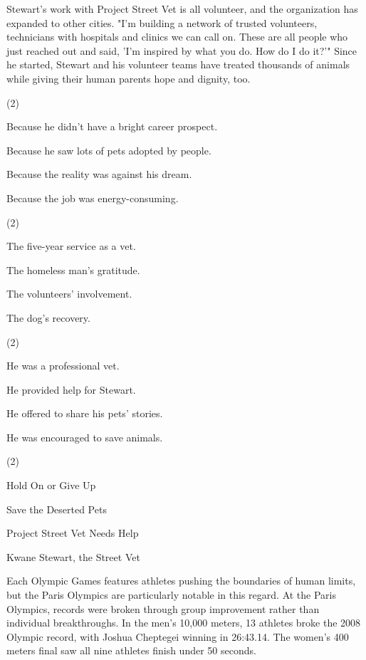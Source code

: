 \documentclass{英语试卷}
\begin{document}
\par Stewart's work with Project Street Vet is all volunteer, and the organization has expanded to other cities. "I'm building a network of trusted volunteers, technicians with hospitals and clinics we can call on. These are all people who just reached out and said, 'I'm inspired by what you do. How do I do it?'" Since he started, Stewart and his volunteer teams have treated thousands of animals while giving their human parents hope and dignity, too.\par
{}
\begin{choices}(2)
  \item Because he didn't have a bright career prospect.
  \item Because he saw lots of pets adopted by people.
  \item Because the reality was against his dream.
  \item Because the job was energy-consuming.
\end{choices}
\begin{choices}(2)
  \item The five-year service as a vet.
  \item The homeless man's gratitude.
  \item The volunteers' involvement.
  \item The dog's recovery.
\end{choices}
\begin{choices}(2)
  \item He was a professional vet.
  \item He provided help for Stewart.
  \item He offered to share his pets' stories.
  \item He was encouraged to save animals.
\end{choices}
\begin{choices}(2)
  \item Hold On or Give Up
  \item Save the Deserted Pets
  \item Project Street Vet Needs Help
  \item Kwane Stewart, the Street Vet
\end{choices}
\par Each Olympic Games features athletes pushing the boundaries of human limits, but the Paris Olympics are particularly notable in this regard. At the Paris Olympics, records were broken through group improvement rather than individual breakthroughs. In the men's 10,000 meters, 13 athletes broke the 2008 Olympic record, with Joshua Cheptegei winning in 26:43.14. The women's 400 meters final saw all nine athletes finish under 50 seconds.\par
\end{document}
